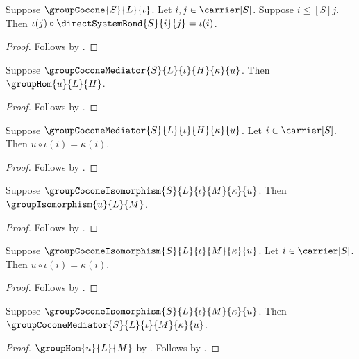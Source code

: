 \begin{proposition}\label{group_cocone_compatibility}
    Suppose $\groupCocone{S}{L}{\iota}$.
    Let $i,j\in\carrier[S]$.
    Suppose $i\mathrel{\leq[S]}j$.
    Then $\iota(j)\circ\directSystemBond{S}{i}{j}=\iota(i)$.
\end{proposition}
\begin{proof}
    Follows by .
\end{proof}

\begin{proposition}\label{group_cocone_mediator_hom}
    Suppose $\groupCoconeMediator{S}{L}{\iota}{H}{\kappa}{u}$.
    Then $\groupHom{u}{L}{H}$.
\end{proposition}
\begin{proof}
    Follows by .
\end{proof}

\begin{proposition}\label{group_cocone_mediator_compatibility}
    Suppose $\groupCoconeMediator{S}{L}{\iota}{H}{\kappa}{u}$.
    Let $i\in\carrier[S]$.
    Then $u\circ\iota(i)=\kappa(i)$.
\end{proposition}
\begin{proof}
    Follows by .
\end{proof}

\begin{proposition}\label{group_cocone_isomorphism_is_iso}
    Suppose $\groupCoconeIsomorphism{S}{L}{\iota}{M}{\kappa}{u}$.
    Then $\groupIsomorphism{u}{L}{M}$.
\end{proposition}
\begin{proof}
    Follows by .
\end{proof}

\begin{proposition}\label{group_cocone_isomorphism_compatibility}
    Suppose $\groupCoconeIsomorphism{S}{L}{\iota}{M}{\kappa}{u}$.
    Let $i\in\carrier[S]$.
    Then $u\circ\iota(i)=\kappa(i)$.
\end{proposition}
\begin{proof}
    Follows by .
\end{proof}

\begin{proposition}\label{group_cocone_isomorphism_is_mediator}
    Suppose $\groupCoconeIsomorphism{S}{L}{\iota}{M}{\kappa}{u}$.
    Then $\groupCoconeMediator{S}{L}{\iota}{M}{\kappa}{u}$.
\end{proposition}
\begin{proof}
    $\groupHom{u}{L}{M}$ by
        .
    Follows by
        .
\end{proof}

